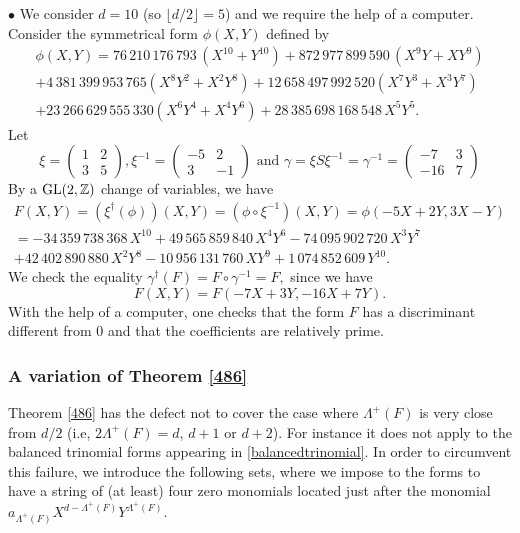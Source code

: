 \documentclass[10pt]{article}
\theoremstyle{definition}
\numberwithin{equation}{section}
\newcommand {\Z}{{\mathbb{Z}}}
\begin{document}
\noindent
$\bullet$ We consider $d=10$ (so $\lfloor d/2\rfloor =5$) and we require the help of a computer. Consider the symmetrical form $\phi (X,Y)$ defined by
\[
\begin{gathered}
\phi (X, Y) =76 \, 210 \, 176 \, 793 \, \left (X^{10}+Y^{10}\right)
+872 \, 977 \, 899 \, 590 \, \left( X^9Y+XY^9\right)\\
+ 4 \, 381 \, 399 \, 953 \,765 \left( X^8Y^2+X^2 Y^8\right) 
+ 12\, 658\, 497\, 992\, 520\left( X^7Y^3 + X^3 Y^7\right)
\\
+23 \, 266 \, 629 \, 555 \, 330\left(X^6Y^4+X^4 Y^6\right) + 28\, 385\, 698\, 168\, 548\, X^5Y^5.
\end{gathered}
\]
Let 
\[
\xi = \begin{pmatrix} 1&2\\3&5 \end{pmatrix}, \xi^{-1} = \begin{pmatrix}-5 & 2 \\ 3&-1\end{pmatrix} \text{ and } \gamma = \xi S \xi^{-1} =\gamma^{-1}= \begin{pmatrix}-7& 3\\ -16& 7\end{pmatrix}
\]
 By a ${\rm GL}(2, \Z)$ change of variables, we have
\[
\begin{gathered}
F(X, Y) =\left(\xi^\dag(\phi) \right)(X,Y)=(\phi \circ \xi^{-1})(X,Y)=\phi (-5X+2Y, 3X-Y)\\
=-34 \, 359 \, 738 \, 368 \, X^{10}
+49 \, 565 \, 859 \, 840 \, X^4Y^6- 74 \, 095 \, 902 \, 720 \, X^3Y^7 
\\
+42 \, 402 \, 890 \, 880 \, X^2Y^8
- 10 \, 956 \, 131 \, 760 \, XY^9 + 1 \, 074 \, 852 \, 609 \, Y^{10}.
\end{gathered}
\]
We check the equality
$ \gamma^\dag (F) = F\circ \gamma^{-1} =F,$ since we have
\[
F(X,Y) = F(-7X+3Y, -16X+7Y).
\]
With the help of a computer, one checks that the form $F$ has a discriminant different from $0$ and that the coefficients are relatively prime.
 
 \subsubsection{A variation of Theorem \ref{486}} 
 
Theorem \ref{486} has the defect not to cover the case where $\Lambda^+ (F)$ is very close from $d/2$
(i.e, $2\Lambda^+(F) = d$, $d+1$ or $d+2$). For instance it does not apply to the balanced trinomial forms appearing in \eqref{balancedtrinomial}. In order to circumvent this failure, we introduce the following sets, where we impose to the forms to have
a string of (at least) four zero monomials located just after the monomial $a_{\Lambda^+ (F)} X^{d-\Lambda^+ (F)} Y^{\Lambda^+ (F)}$.
 
\end{document}
